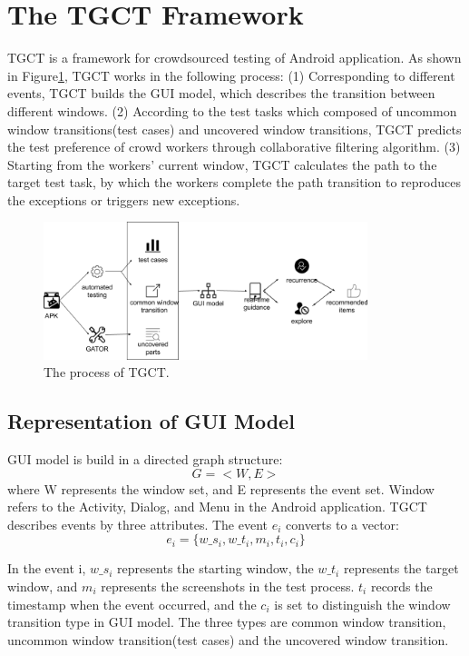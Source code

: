 \section{The TGCT Framework}
TGCT is a framework for crowdsourced testing of Android application. As shown in Figure\ref{fig:arch}, TGCT works in the following process: (1) Corresponding to different events, TGCT builds the GUI model, which describes the transition between different windows. (2) According to the test tasks which composed of uncommon window transitions(test cases) and uncovered window transitions, TGCT predicts the test preference of crowd workers through collaborative filtering algorithm. (3) Starting from the workers' current window, TGCT calculates the path to the target test task, by which the workers complete the path transition to reproduces the exceptions or triggers new exceptions.
\begin{figure}[htbp]
\centering
\centerline{\includegraphics[width=\columnwidth,height=4cm]{fig/2.png}}
\caption{The process of TGCT.}
\label{fig:arch}
\end{figure}

\subsection{Representation of GUI Model}
GUI model is build in a directed graph structure: 
\begin{equation}
G = < W, E >
\end{equation}
where W represents the window set, and E represents the event set. Window refers to the Activity, Dialog, and Menu in the Android application. TGCT describes events by three attributes. The event $e_{i}$ converts to a vector:
\begin{equation}
e_{i} = \{w\_s_{i}, w\_t_{i}, m_{i}, t_{i}, c_{i}\}
\end{equation}

In the event i, $w\_s_{i}$ represents the starting window, the $w\_t_{i}$ represents the target window, and $m_{i}$ represents the screenshots in the test process. $t_{i}$ records the timestamp when the event occurred, and the $c_{i}$ is set to distinguish the window transition type in GUI model. The three types are common window transition, uncommon window transition(test cases) and the uncovered window transition.

